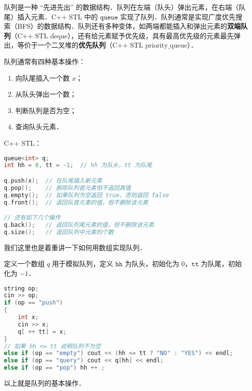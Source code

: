 
队列是一种 “先进先出” 的数据结构．队列在左端（队头）弹出元素，在右端（队尾）插入元素．C++ STL 中的 $\mathtt{queue}$ 实现了队列．队列通常是实现广度优先搜索（BFS）的数据结构．队列还有多种变体，如两端都能插入和弹出元素的\textbf{双端队列}（$\text{C++ STL deque}$），还有给元素赋予优先级，具有最高优先级的元素最先弹出，等价于一个二叉堆的\textbf{优先队列}（$\text{C++ STL priority_queue}$）．

队列通常有四种基本操作：

\begin{enumerate}
\item 向队尾插入一个数 $x$；
\item 从队头弹出一个数；
\item 判断队列是否为空；
\item 查询队头元素．
\end{enumerate}

C++ STL：

\begin{lstlisting}[language=cpp]
queue<int> q;
int hh = 0, tt = -1;  // hh 为队头，tt 为队尾

q.push(x);  // 在队尾插入新元素
q.pop();    // 删除队列首元素但不返回其值
q.empty();  // 如果队列为空返回 true，否则返回 false
q.front();  // 返回队首元素的值，但不删除该元素

// 还有如下几个操作
q.back();   // 返回队列尾元素的值，但不删除该元素
q.size();   // 返回队列中元素的个数

\end{lstlisting}

我们这里也是着重讲一下如何用数组实现队列．

定义一个数组 $q$ 用于模拟队列，定义 $\mathtt{hh}$ 为队头，初始化为 $0$，$\mathtt{tt}$ 为队尾，初始化为 $-1$．

\begin{lstlisting}[language=cpp]
string op;
cin >> op;
if (op == "push") 
{
    int x;
    cin >> x;
    q[ ++ tt] = x;
} 
// 如果 hh <= tt 说明队列不为空
else if (op == "empty") cout << (hh <= tt ? "NO" : "YES") << endl;
else if (op == "query") cout << q[hh] << endl;
else if (op == "pop") hh ++ ;
\end{lstlisting}

以上就是队列的基本操作．
